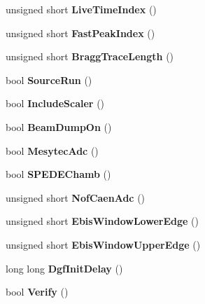 \begin{DoxyCompactItemize}
unsigned short {\bfseries Live\+Time\+Index} ()
\item 
\mbox{\label{class_global_settings_a3045c1e47cf31b2a1f2cdd036d2983d1}} 
unsigned short {\bfseries Fast\+Peak\+Index} ()
\item 
\mbox{\label{class_global_settings_a736690f2a63bcdb18f04f9831a484240}} 
unsigned short {\bfseries Bragg\+Trace\+Length} ()
\item 
\mbox{\label{class_global_settings_a111d8b0e788e3709b00702f3a7ae2728}} 
bool {\bfseries Source\+Run} ()
\item 
\mbox{\label{class_global_settings_a49c569d0d122bff3736e8e3debbfd013}} 
bool {\bfseries Include\+Scaler} ()
\item 
\mbox{\label{class_global_settings_a817f8562e00c84885bb367d33b409b76}} 
bool {\bfseries Beam\+Dump\+On} ()
\item 
\mbox{\label{class_global_settings_acfaa849a405a80e912b1c42c7b0c258c}} 
bool {\bfseries Mesytec\+Adc} ()
\item 
\mbox{\label{class_global_settings_a4a48a1c192b77998f1b1111d73aeaf5a}} 
bool {\bfseries S\+P\+E\+D\+E\+Chamb} ()
\item 
\mbox{\label{class_global_settings_a0451be00dc54ba72b862ba682399e5e2}} 
unsigned short {\bfseries Nof\+Caen\+Adc} ()
\item 
\mbox{\label{class_global_settings_ae3067cec604f4bf7692c2a635411ffa3}} 
unsigned short {\bfseries Ebis\+Window\+Lower\+Edge} ()
\item 
\mbox{\label{class_global_settings_ad13bfa3edd5436f4096e52d742348da7}} 
unsigned short {\bfseries Ebis\+Window\+Upper\+Edge} ()
\item 
\mbox{\label{class_global_settings_a2b7b49aa025fef97a5c5bf50f7b181c7}} 
long long {\bfseries Dgf\+Init\+Delay} ()
\item 
\mbox{\label{class_global_settings_a7057529627ce885278a417a6b31634fd}} 
bool {\bfseries Verify} ()
\end{DoxyCompactItemize}
